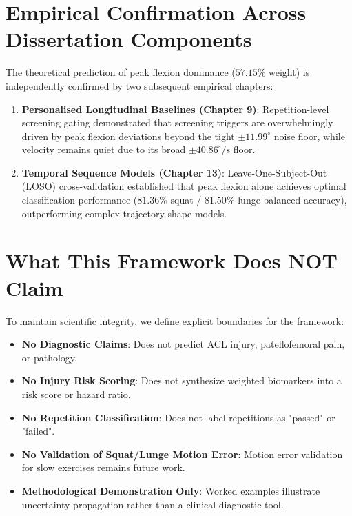 \section{Empirical Confirmation Across Dissertation Components}
\label{sec:8-6-empirical-confirmation-across-dissertation-components}


The theoretical prediction of peak flexion dominance ($57.15\%$ weight) is independently confirmed by two subsequent empirical chapters:
\begin{enumerate}
  \item \textbf{Personalised Longitudinal Baselines (Chapter 9)}: Repetition-level screening gating demonstrated that screening triggers are overwhelmingly driven by peak flexion deviations beyond the tight $\pm 11.99^\circ$ noise floor, while velocity remains quiet due to its broad $\pm 40.86^\circ/\text{s}$ floor.
  \item \textbf{Temporal Sequence Models (Chapter 13)}: Leave-One-Subject-Out (LOSO) cross-validation established that peak flexion alone achieves optimal classification performance ($81.36\%$ squat / $81.50\%$ lunge balanced accuracy), outperforming complex trajectory shape models.
\end{enumerate}



\section{What This Framework Does NOT Claim}
\label{sec:8-7-what-this-framework-does-not-claim}


To maintain scientific integrity, we define explicit boundaries for the framework:
\begin{itemize}
  \item \textbf{No Diagnostic Claims}: Does not predict ACL injury, patellofemoral pain, or pathology.
  \item \textbf{No Injury Risk Scoring}: Does not synthesize weighted biomarkers into a risk score or hazard ratio.
  \item \textbf{No Repetition Classification}: Does not label repetitions as "passed" or "failed".
  \item \textbf{No Validation of Squat/Lunge Motion Error}: Motion error validation for slow exercises remains future work.
  \item \textbf{Methodological Demonstration Only}: Worked examples illustrate uncertainty propagation rather than a clinical diagnostic tool.
\end{itemize}




